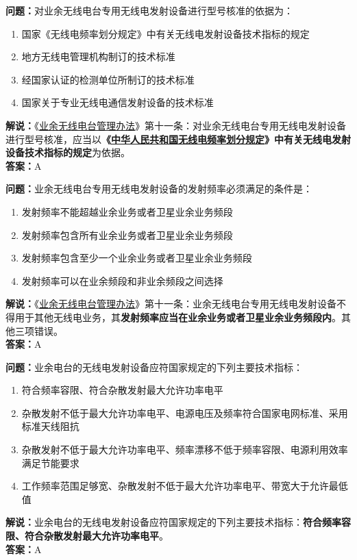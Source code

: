 \textbf{问题：}对业余无线电台专用无线电发射设备进行型号核准的依据为：
\begin{enumerate}[label=\Alph*), leftmargin=1.5cm]
	\item 国家《无线电频率划分规定》中有关无线电发射设备技术指标的规定
	\item 地方无线电管理机构制订的技术标准
	\item 经国家认证的检测单位所制订的技术标准
	\item 国家关于专业无线电通信发射设备的技术标准
\end{enumerate}
\textbf{解说：}《\href{https://www.miit.gov.cn/jgsj/zfs/bmgz/art/2020/art_147b69815b3641caad9047735f94c860.html}{业余无线电台管理办法}》第十一条：对业余无线电台专用无线电发射设备进行型号核准，应当以\textbf{《\href{https://www.miit.gov.cn/zwgk/zcwj/wjfb/txy/art/2020/art_066386284cd2449493586c81ccafed11.html}{中华人民共和国无线电频率划分规定}》中有关无线电发射设备技术指标的规定}为依据。\\\textbf{答案：}A

\textbf{问题：}业余无线电台专用无线电发射设备的发射频率必须满足的条件是：
\begin{enumerate}[label=\Alph*), leftmargin=1.5cm]
	\item 发射频率不能超越业余业务或者卫星业余业务频段
	\item 发射频率包含所有业余业务或者卫星业余业务频段
	\item 发射频率包含至少一个业余业务或者卫星业余业务频段
	\item 发射频率可以在业余频段和非业余频段之间选择
\end{enumerate}
\textbf{解说：}《\href{https://www.miit.gov.cn/jgsj/zfs/bmgz/art/2020/art_147b69815b3641caad9047735f94c860.html}{业余无线电台管理办法}》第十一条：业余无线电台专用无线电发射设备不得用于其他无线电业务，其\textbf{发射频率应当在业余业务或者卫星业余业务频段内}。其他三项错误。\\\textbf{答案：}A

\textbf{问题：}业余电台的无线电发射设备应符国家规定的下列主要技术指标：
\begin{enumerate}[label=\Alph*), leftmargin=1.5cm]
	\item 符合频率容限、符合杂散发射最大允许功率电平
	\item 杂散发射不低于最大允许功率电平、电源电压及频率符合国家电网标准、采用标准天线阻抗
	\item 杂散发射不低于最大允许功率电平、频率漂移不低于频率容限、电源利用效率满足节能要求
	\item 工作频率范围足够宽、杂散发射不低于最大允许功率电平、带宽大于允许最低值
\end{enumerate}
\textbf{解说：}业余电台的无线电发射设备应符国家规定的下列主要技术指标：\textbf{符合频率容限、符合杂散发射最大允许功率电平}。\\\textbf{答案：}A%

